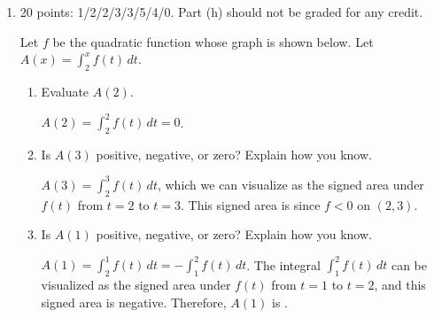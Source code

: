\documentclass{article}
\begin{document}
\begin{enumerate}[topsep=0pt]
\begin{enumerate}[topsep=0pt]
  \end{enumerate}

\item 

\begin{grading}
20 points: 1/2/2/3/3/5/4/0. Part (h) should not be graded for any credit.
\end{grading}

  Let $f$ be the quadratic function whose graph is shown below.
  Let $A(x)=\displaystyle \int_2^x f(t)\,dt$.


  \begin{enumerate}
  \item
    \begin{problem}[\vfill]
      Evaluate $A(2)$. 
    \end{problem}

    \begin{solution} %
      $\displaystyle A(2) = \int_2^2 f(t) \, dt = 0$.
    \end{solution}

  \item
    \begin{problem}[\vfill]
      Is $A(3)$ positive, negative, or zero?  Explain how you know. 
    \end{problem}

    \begin{solution} 
      $A(3) = \displaystyle \int_2^3 f(t)\,dt$, which we can visualize
      as the signed area under $f(t)$ from $t = 2$ to $t = 3$.  This
      signed area is  since $f < 0$ on $(2, 3)$.
    \end{solution}

  \item
    \begin{problem}[\vfill]
      Is $A(1)$ positive, negative, or zero?  Explain how you know.
    \end{problem}

    \begin{solution}
      $A(1) = \displaystyle \int_2^1 f(t)\,dt = -\int_1^2 f(t)\,dt$.
      The integral $\displaystyle \int_1^2 f(t)\,dt$ can be visualized as
      the signed area under $f(t)$ from $t = 1$ to $t = 2$, and this
      signed area is negative.  Therefore, $A(1)$ is . 
    \end{solution}


\end{enumerate}
\end{enumerate}
\end{document}
